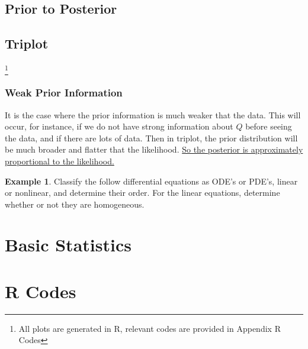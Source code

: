 \documentclass[lecture,12pt,]{pcms-l}
\numberwithin{section}{chapter}
\numberwithin{equation}{chapter}
\theoremstyle{plain}
\theoremstyle{definition}
\newtheorem{example}{Example}[section]
\theoremstyle{definition}
\begin{document}
\section{Prior to Posterior}

\section{Triplot}

\footnote{All plots are generated in R, relevant codes are provided in Appendix R Codes }
\vfill
\eject

\subsection{Weak Prior Information}
It is the case where the prior information is much weaker that the data. This will occur, for instance, if we do not have strong information about $Q$ before seeing the  data, and if there are lots of data. Then in triplot, the prior distribution will be much broader and flatter that the likelihood. \underline{So the posterior is approximately proportional to the likelihood.}
\begin{example}
Classify the follow differential equations as ODE's or PDE's, linear
or nonlinear, and determine their order. For the linear equations,
determine whether or not they are homogeneous.
\end{example}



\vfill
\eject






\appendix


\chapter*{Basic Statistics}

\chapter*{R Codes}





\end{document}
